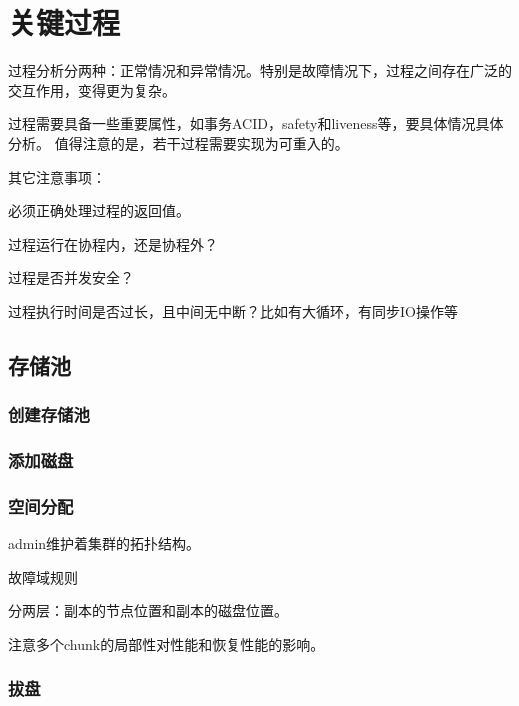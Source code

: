 \chapter{关键过程}

过程分析分两种：正常情况和异常情况。特别是故障情况下，过程之间存在广泛的交互作用，变得更为复杂。

过程需要具备一些重要属性，如事务ACID，safety和liveness等，要具体情况具体分析。
值得注意的是，若干过程需要实现为可重入的。

其它注意事项：
\begin{compactenum}
\item 必须正确处理过程的返回值。
\item 过程运行在协程内，还是协程外？
\item 过程是否并发安全？
\item 过程执行时间是否过长，且中间无中断？比如有大循环，有同步IO操作等
\end{compactenum}

\section{存储池}

\subsection{创建存储池}

\subsection{添加磁盘}


\subsection{空间分配}

admin维护着集群的拓扑结构。

故障域规则

分两层：副本的节点位置和副本的磁盘位置。

注意多个chunk的局部性对性能和恢复性能的影响。

\subsection{拔盘}

